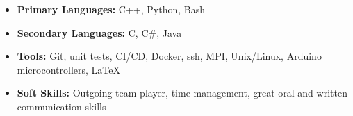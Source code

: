 \documentclass{article}
\begin{document}
\begin{itemize}
    \item \textbf{Primary Languages:} C++, Python, Bash
    \item \textbf{Secondary Languages:} C, C\#, Java
    \item \textbf{Tools:} Git, unit tests, CI/CD, Docker, ssh, MPI, Unix/Linux, Arduino microcontrollers, \LaTeX
    \item \textbf{Soft Skills:}  Outgoing team player, time management, great oral and written communication skills
\end{itemize}



\end{document}
